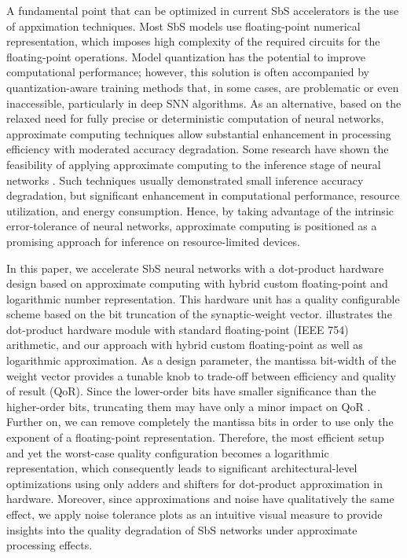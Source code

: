 A fundamental point that can be optimized in current SbS accelerators
is the use of appximation techniques. 
Most SbS models use floating-point numerical representation, which imposes high complexity of the required circuits for the floating-point operations. Model quantization has the potential to improve computational performance; however, this solution is often accompanied by quantization-aware training methods that, in some cases, are problematic or even inaccessible, particularly in deep SNN algorithms\cite{zhang2018survey}. 
As an alternative, based on the relaxed need for fully precise or deterministic computation of neural networks, approximate computing techniques allow substantial enhancement in processing efficiency with moderated accuracy degradation. Some research  have shown the feasibility of applying approximate computing to the inference stage of neural networks \cite{lotrivc2012applicability, sarwar2016multiplier, mrazek2016design, du2014leveraging}. Such techniques usually demonstrated small inference accuracy degradation, but significant enhancement in computational performance, resource utilization, and energy consumption. Hence, by taking advantage of the intrinsic error-tolerance of neural networks, approximate computing is positioned as a promising approach for inference on resource-limited devices.

In this paper, we accelerate SbS neural networks with a dot-product hardware design based on approximate computing with hybrid custom floating-point and logarithmic number representation. This hardware unit has a quality configurable scheme based on the bit truncation of the synaptic-weight vector.  illustrates the dot-product hardware module with standard floating-point (IEEE 754) arithmetic, and our approach with hybrid custom floating-point as well as logarithmic approximation. As a design parameter, the mantissa bit-width of the weight vector provides a tunable knob to trade-off between efficiency and quality of result (QoR)\cite{park2009dynamic, han2013approximate}. Since the lower-order bits have smaller significance than the higher-order bits, truncating them may have only a minor impact on QoR \cite{gupta2011impact, mittal2016survey}. Further on, we can remove completely the mantissa bits in order to use only the exponent of a floating-point representation. Therefore, the most efficient setup and yet the worst-case quality configuration becomes a logarithmic representation, which consequently leads to significant architectural-level optimizations using only adders and shifters for dot-product approximation in hardware. Moreover, since approximations and noise have qualitatively the same effect\cite{venkataramani2015approximate}, we apply noise tolerance plots as an intuitive visual measure to provide insights into the quality degradation of SbS networks under approximate processing effects.

